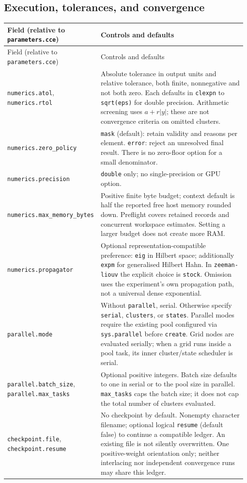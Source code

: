 \documentclass[11pt,a4paper]{article}
\newcommand{\code}[1]{\texttt{#1}}
\begin{document}
\subsection{Execution, tolerances, and convergence}
\begingroup\small
\begin{longtable}{@{}>{\raggedright\arraybackslash}p{0.335\linewidth}@{\hspace{0.025\linewidth}}>{\raggedright\arraybackslash}p{0.64\linewidth}@{}}
\toprule
Field (relative to \code{parameters.cce}) & Controls and defaults\\
\midrule\endfirsthead
\toprule
Field (relative to \code{parameters.cce}) & Controls and defaults\\
\midrule\endhead
\midrule\endfoot
\bottomrule\endlastfoot
\code{numerics.atol}, \code{numerics.rtol} & Absolute tolerance in output units and relative tolerance, both finite, nonnegative and not both zero. Each defaults in \code{clexpn} to \code{sqrt(eps)} for double precision. Arithmetic screening uses $a+r\lvert y\rvert$; these are not convergence criteria on omitted clusters.\\
\code{numerics.zero\_policy} & \code{mask} (default): retain validity and reasons per element. \code{error}: reject an unresolved final result. There is no zero-floor option for a small denominator.\\
\code{numerics.precision} & \code{double} only; no single-precision or GPU option.\\
\code{numerics.max\_memory\_bytes} & Positive finite byte budget; context default is half the reported free host memory rounded down. Preflight covers retained records and concurrent workspace estimates. Setting a larger budget does not create more RAM.\\
\code{numerics.propagator} & Optional representation-compatible preference: \code{eig} in Hilbert space; additionally \code{expm} for generalised Hilbert Hahn. In \code{zeeman-liouv} the explicit choice is \code{stock}. Omission uses the experiment's own propagation path, not a universal dense exponential.\\
\code{parallel.mode} & Without \code{parallel}, serial. Otherwise specify \code{serial}, \code{clusters}, or \code{states}. Parallel modes require the existing pool configured via \code{sys.parallel} before \code{create}. Grid nodes are evaluated serially; when a grid runs inside a pool task, its inner cluster/state scheduler is serial.\\
\code{parallel.batch\_size}, \code{parallel.max\_tasks} & Optional positive integers. Batch size defaults to one in serial or to the pool size in parallel. \code{max\_tasks} caps the batch size; it does not cap the total number of clusters evaluated.\\
\code{checkpoint.file}, \code{checkpoint.resume} & No checkpoint by default. Nonempty character filename; optional logical \code{resume} (default false) to continue a compatible ledger. An existing file is not silently overwritten. One positive-weight orientation only; neither interlacing nor independent convergence runs may share this ledger.\\
\end{longtable}
\end{document}
